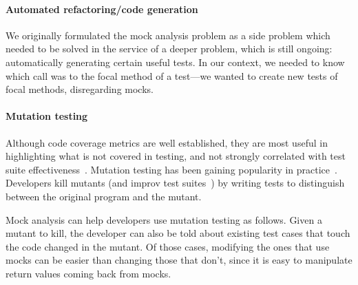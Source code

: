 \paragraph{Automated refactoring/code generation}
We originally formulated the mock analysis problem as a side problem which needed
to be solved in the service of a deeper problem, which is still
ongoing: automatically generating certain useful tests. In our context,
we needed to know which call was to the focal method of a test---we
wanted to create new tests of focal methods,
disregarding mocks.

\paragraph{Mutation testing}
Although code coverage metrics are well established, they are most useful in highlighting what is not covered in testing, and not strongly correlated with test suite effectiveness~\cite{inozemtseva14:_cover_not_stron_correl_test_suite_effec}. Mutation testing has been gaining popularity in practice~\cite{petrovic55:_pract_mutat_testin_scale,beller2021use}.
Developers kill mutants (and improv test suites~\cite{Petrovic:mutation_testing}) by writing tests to distinguish between the original program and the mutant. 

Mock analysis can help developers use mutation testing as follows. Given a mutant to kill, the developer can also be told about existing test cases that touch the code changed in the mutant. Of those cases, modifying the ones that use mocks can be easier than changing those that don't, since it is easy to manipulate return values coming back from mocks.



